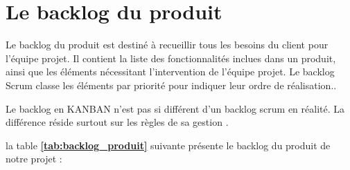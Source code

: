   \section{Le backlog du produit}
\par Le backlog du produit est destiné à recueillir tous les besoins du client pour l'équipe projet. Il contient la liste des fonctionnalités inclues dans un produit, ainsi que les éléments nécessitant l'intervention de l'équipe projet. Le backlog Scrum classe les éléments par priorité pour indiquer leur ordre de réalisation.\cite{blog}.

 \par Le backlog en KANBAN n'est pas si différent d'un backlog scrum en réalité. La différence réside surtout sur les règles de sa gestion \cite{BPK}.  
    
    \par la table \textbf{\ref{tab:backlog_produit}} suivante présente le backlog du produit de notre projet :
